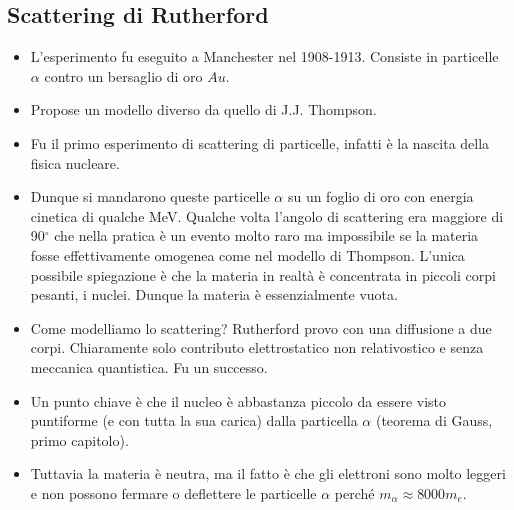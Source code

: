 \subsection{Scattering di Rutherford}
\begin{itemize}
    \item L'esperimento fu eseguito a Manchester nel 1908-1913. Consiste in particelle $\alpha$ contro un bersaglio di oro $Au$.
    \item Propose un modello diverso da quello di J.J. Thompson.
    \item Fu il primo esperimento di scattering di particelle, infatti è la nascita della fisica nucleare.
    \item Dunque si mandarono queste particelle $\alpha$ su un foglio di oro con energia cinetica di qualche MeV. Qualche volta l'angolo di scattering era maggiore di 90$^\circ$ che nella pratica è un evento molto raro ma impossibile se la materia fosse effettivamente omogenea come nel modello di Thompson. L'unica possibile spiegazione è che la materia in realtà è concentrata in piccoli corpi pesanti, i nuclei. Dunque la materia è essenzialmente vuota.
    \item Come modelliamo lo scattering? Rutherford provo con una diffusione a due corpi. Chiaramente solo contributo elettrostatico non relativostico e senza meccanica quantistica. Fu un successo.
    \item Un punto chiave è che il nucleo è abbastanza piccolo da essere visto puntiforme (e con tutta la sua carica) dalla particella $\alpha$ (teorema di Gauss, primo capitolo).
    \item Tuttavia la materia è neutra, ma il fatto è che gli elettroni sono molto leggeri e non possono fermare o deflettere le particelle $\alpha$ perché $m_\alpha\approx8000m_e$.
\end{itemize}
